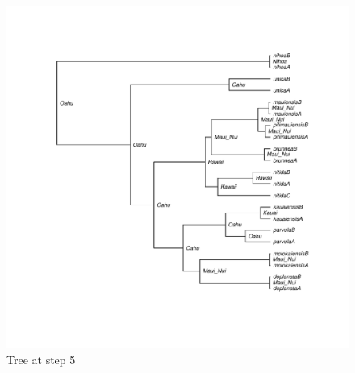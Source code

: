 \documentclass[a4paper]{article}
\begin{document}
\begin{figure}[h!]
\includegraphics[]{figures/tree_5.pdf}
\caption{Tree at step 5}
\end{figure}
\end{document}
